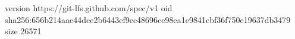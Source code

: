 version https://git-lfs.github.com/spec/v1
oid sha256:656b214aae44dce2b6443ef9ec48696ce98ea1e9841cbf36f750e19637db3479
size 26571
